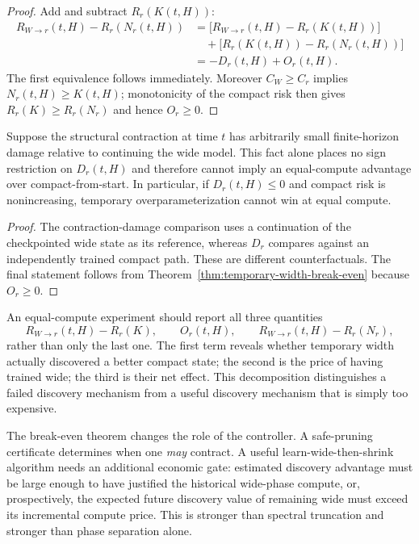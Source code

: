 \begin{proof}
Add and subtract $R_r(K(t,H))$:
\begin{align*}
R_{W\to r}(t,H)-R_r(N_r(t,H))
&=
\bigl[R_{W\to r}(t,H)-R_r(K(t,H))\bigr]\\
&\quad+
\bigl[R_r(K(t,H))-R_r(N_r(t,H))\bigr]\\
&=-D_r(t,H)+O_r(t,H).
\end{align*}
The first equivalence follows immediately. Moreover $C_W\ge C_r$ implies $N_r(t,H)\ge K(t,H)$; monotonicity of the compact risk then gives $R_r(K)\ge R_r(N_r)$ and hence $O_r\ge0$.
\end{proof}

\begin{corollary}\label{cor:safety-not-enough}
Suppose the structural contraction at time $t$ has arbitrarily small finite-horizon damage relative to continuing the wide model. This fact alone places no sign restriction on $D_r(t,H)$ and therefore cannot imply an equal-compute advantage over compact-from-start. In particular, if $D_r(t,H)\le0$ and compact risk is nonincreasing, temporary overparameterization cannot win at equal compute.
\end{corollary}

\begin{proof}
The contraction-damage comparison uses a continuation of the checkpointed wide state as its reference, whereas $D_r$ compares against an independently trained compact path. These are different counterfactuals. The final statement follows from Theorem~\ref{thm:temporary-width-break-even} because $O_r\ge0$.
\end{proof}

\begin{remark}
An equal-compute experiment should report all three quantities
\[
R_{W\to r}(t,H)-R_r(K),
\qquad
O_r(t,H),
\qquad
R_{W\to r}(t,H)-R_r(N_r),
\]
rather than only the last one. The first term reveals whether temporary width actually discovered a better compact state; the second is the price of having trained wide; the third is their net effect. This decomposition distinguishes a failed discovery mechanism from a useful discovery mechanism that is simply too expensive.
\end{remark}

\begin{remark}
The break-even theorem changes the role of the controller. A safe-pruning certificate determines when one \emph{may} contract. A useful learn-wide-then-shrink algorithm needs an additional economic gate: estimated discovery advantage must be large enough to have justified the historical wide-phase compute, or, prospectively, the expected future discovery value of remaining wide must exceed its incremental compute price. This is stronger than spectral truncation and stronger than phase separation alone.
\end{remark}

